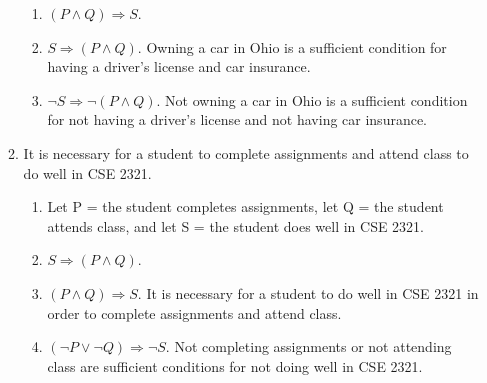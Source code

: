 \documentclass[10pt]{article}
\theoremstyle{plain}
\theoremstyle{definition}
\begin{document}
\begin{enumerate}
\begin{enumerate}
\begin{enumerate}
\item $(P \wedge Q) \Rightarrow S$. 

\item $S \Rightarrow (P \wedge Q)$. Owning a car in Ohio is a sufficient condition for having a driver's license and car insurance. 

\item $\neg S \Rightarrow \neg (P \wedge Q)$. Not owning a car in Ohio is a sufficient condition for not having a driver's license and not having car insurance. 

\end{enumerate}

\item It is necessary for a student to complete assignments and attend class to do well in CSE 2321. 

\begin{enumerate}

\item Let P = the student completes assignments, let Q = the student attends class, and let S = the student does well in CSE 2321. 

\item $S \Rightarrow (P \wedge Q)$. 

\item $(P \wedge Q) \Rightarrow S$. It is necessary for a student to do well in CSE 2321 in order to complete assignments and attend class. 

\item $(\neg P \vee \neg Q) \Rightarrow \neg S$. Not completing assignments or not attending class are sufficient conditions for not doing well in CSE 2321. 

\end{enumerate}


\end{enumerate}


\end{enumerate}
\end{document}
